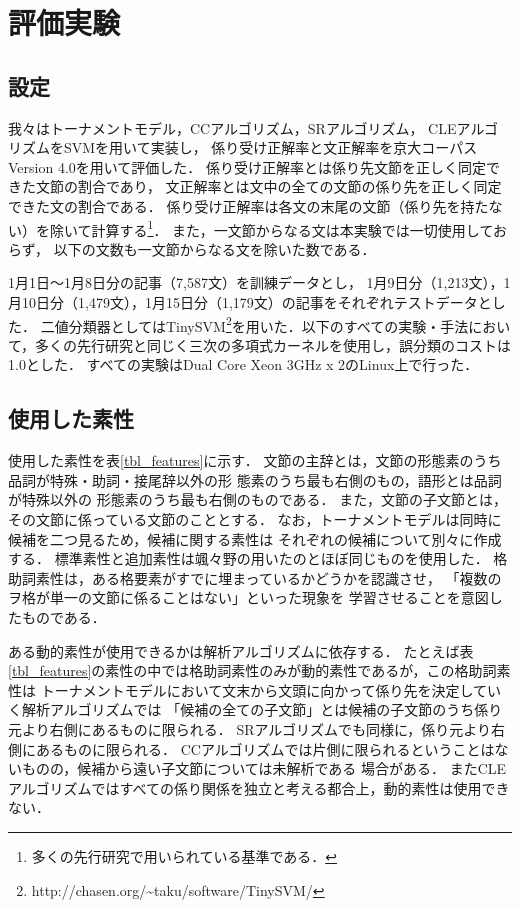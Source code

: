 \documentclass[japanese]{jnlp_1.4}
\begin{document}
\section{評価実験}

\subsection{設定}
\label{sec:experimental_settings}

我々はトーナメントモデル，CCアルゴリズム，SRアルゴリズム，
CLEアルゴリズムをSVMを用いて実装し，
係り受け正解率と文正解率を京大コーパスVersion 4.0を用いて評価した．
係り受け正解率とは係り先文節を正しく同定できた文節の割合であり，
文正解率とは文中の全ての文節の係り先を正しく同定できた文の割合である．
係り受け正解率は各文の末尾の文節（係り先を持たない）を除いて計算する\footnote{
	多くの先行研究で用いられている基準である．}．
また，一文節からなる文は本実験では一切使用しておらず，
以下の文数も一文節からなる文を除いた数である．

1月1日〜1月8日分の記事（7,587文）を訓練データとし，
1月9日分（1,213文），1月10日分（1,479文），1月15日分（1,179文）の記事をそれぞれテストデータとした．
二値分類器としてはTinySVM\footnote{
	http:\slash\slash{}chasen.org\slash\~{}taku\slash{}software\slash{}TinySVM\slash}を用いた．以下のすべての実験・手法において，多くの先行研究と同じく三次の多項式カーネルを使用し，誤分類のコストは1.0とした．
すべての実験はDual Core Xeon 3GHz x 2のLinux上で行った．


\subsection{使用した素性}

使用した素性を表\ref{tbl_features}に示す．
文節の主辞とは，文節の形態素のうち品詞が特殊・助詞・接尾辞以外の形
態素のうち最も右側のもの，語形とは品詞が特殊以外の
形態素のうち最も右側のものである．
また，文節の子文節とは，その文節に係っている文節のこととする．
なお，トーナメントモデルは同時に候補を二つ見るため，候補に関する素性は
それぞれの候補について別々に作成する．
標準素性と追加素性は颯々野の用いたのとほぼ同じものを使用した．
格助詞素性は，ある格要素がすでに埋まっているかどうかを認識させ，
「複数のヲ格が単一の文節に係ることはない」といった現象を
学習させることを意図したものである．

ある動的素性が使用できるかは解析アルゴリズムに依存する．
たとえば表\ref{tbl_features}の素性の中では格助詞素性のみが動的素性であるが，この格助詞素性は
トーナメントモデルにおいて文末から文頭に向かって係り先を決定していく解析アルゴリズムでは
「候補の全ての子文節」とは候補の子文節のうち係り元より右側にあるものに限られる．
SRアルゴリズムでも同様に，係り元より右側にあるものに限られる．
CCアルゴリズムでは片側に限られるということはないものの，候補から遠い子文節については未解析である
場合がある．
またCLEアルゴリズムではすべての係り関係を独立と考える都合上，動的素性は使用できない．
\end{document}
